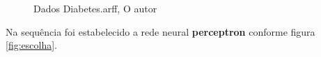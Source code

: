 \begin{figure}[H]
  \center
  \caption{Dados Diabetes.arff, O autor}\label{fig:dados}
\end{figure}
\par Na sequência foi estabelecido a rede neural \textbf{perceptron} conforme figura \ref{fig:escolha}.

